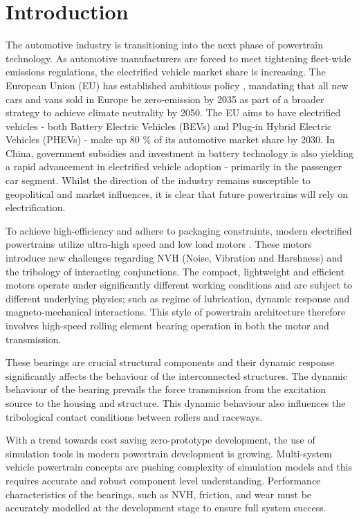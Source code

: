 \chapter{Introduction} \label{Introduction}

The automotive industry is transitioning into the next phase of powertrain technology. As automotive manufacturers are forced to meet tightening fleet-wide emissions regulations, the electrified vehicle market share is increasing. The European Union (EU) has established ambitious policy \cite{EUL110/5}, mandating that all new cars and vans sold in Europe be zero-emission by 2035 as part of a broader strategy to achieve climate neutrality by 2050. The EU aims to have electrified vehicles - both Battery Electric Vehicles (BEVs) and Plug-in Hybrid Electric Vehicles (PHEVs) - make up 80 \% of its automotive market share by 2030. In China, government subsidies and investment in battery technology is also yielding a rapid advancement in electrified vehicle adoption - primarily in the passenger car segment. Whilst the direction of the industry remains susceptible to geopolitical and market influences, it is clear that future powertrains will rely on electrification.

To achieve high-efficiency and adhere to packaging constraints, modern electrified powertrains utilize ultra-high speed and low load motors \cite{Cai2021}. These motors introduce new challenges regarding NVH (Noise, Vibration and Harshness) and the tribology of interacting conjunctions. The compact, lightweight and efficient motors operate under significantly different working conditions and are subject to different underlying physics; such as regime of lubrication, dynamic response and magneto-mechanical interactions. This style of powertrain architecture therefore involves high-speed rolling element bearing operation in both the motor and transmission.

These bearings are crucial structural components and their dynamic response significantly affects the behaviour of the interconnected structures. The dynamic behaviour of the bearing prevails the force transmission from the excitation source to the housing and structure. This dynamic behaviour also influences the tribological contact conditions between rollers and raceways.

With a trend towards cost saving zero-prototype development, the use of simulation tools in modern powertrain development is growing. Multi-system vehicle powertrain concepts are pushing complexity of simulation models and this requires accurate and robust component level understanding. Performance characteristics of the bearings, such as NVH, friction, and wear must be accurately modelled at the development stage to ensure full system success.


